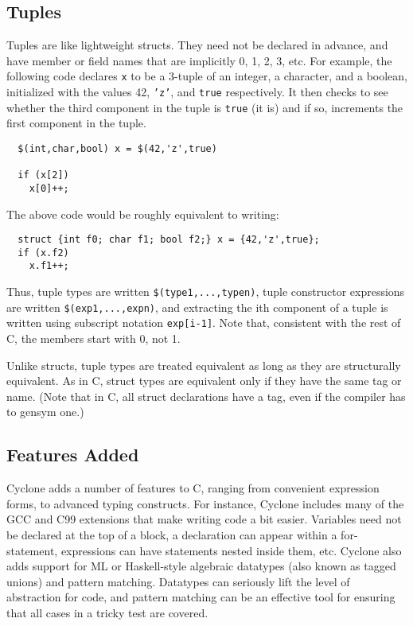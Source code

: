 \subsection{Tuples}

Tuples are like lightweight structs.  They need not be declared in
advance, and have member or field names that are implicitly 0, 1, 2,
3, etc.  For example, the following code declares \texttt{x} to be a
3-tuple of an integer, a character, and a boolean, initialized with
the values 42, \texttt{'z'}, and \texttt{true} respectively.  It then
checks to see whether the third component in the tuple is \texttt{true}
(it is) and if so, increments the first component in the tuple.
\begin{verbatim}
  $(int,char,bool) x = $(42,'z',true)

  if (x[2])
    x[0]++;
\end{verbatim}

The above code would be roughly equivalent to writing:
\begin{verbatim}
  struct {int f0; char f1; bool f2;} x = {42,'z',true};
  if (x.f2)
    x.f1++;
\end{verbatim}

Thus, tuple types are written \texttt{\$(type1,...,typen)}, tuple
constructor expressions are written \texttt{\$(exp1,...,expn)}, and
extracting the ith component of a tuple is written using subscript
notation \texttt{exp[i-1]}.  Note that, consistent with the rest of C,
the members start with 0, not 1.

Unlike structs, tuple types are treated equivalent as long as they are
structurally equivalent.  As in C, struct types are equivalent only if
they have the same tag or name.  (Note that in C, all struct
declarations have a tag, even if the compiler has to gensym one.)


\subsection{Features Added}

Cyclone adds a number of features to C, ranging from convenient
expression forms, to advanced typing constructs.  For instance,
Cyclone includes many of the GCC and C99 extensions that make writing
code a bit easier.  Variables need not be declared at the top of a
block, a declaration can appear within a for-statement, expressions
can have statements nested inside them, etc.  Cyclone also adds
support for ML or Haskell-style algebraic datatypes (also known as
tagged unions) and pattern matching.  Datatypes can seriously lift the
level of abstraction for code, and pattern matching can be an
effective tool for ensuring that all cases in a tricky test are
covered.

